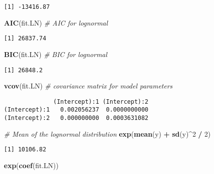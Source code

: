 \documentclass[]{book}
\newenvironment{Shaded}{\begin{snugshade}}{\end{snugshade}}
\newcommand{\KeywordTok}[1]{\textcolor[rgb]{0.13,0.29,0.53}{\textbf{#1}}}
\newcommand{\DecValTok}[1]{\textcolor[rgb]{0.00,0.00,0.81}{#1}}
\newcommand{\StringTok}[1]{\textcolor[rgb]{0.31,0.60,0.02}{#1}}
\newcommand{\CommentTok}[1]{\textcolor[rgb]{0.56,0.35,0.01}{\textit{#1}}}
\newcommand{\OperatorTok}[1]{\textcolor[rgb]{0.81,0.36,0.00}{\textbf{#1}}}
\newcommand{\NormalTok}[1]{#1}
\theoremstyle{definition}
\theoremstyle{definition}
\theoremstyle{definition}
\theoremstyle{remark}
\begin{document}
\begin{verbatim}
[1] -13416.87
\end{verbatim}

\begin{Shaded}
\begin{Highlighting}[]
\KeywordTok{AIC}\NormalTok{(fit.LN)                    }\CommentTok{# AIC for lognormal}
\end{Highlighting}
\end{Shaded}

\begin{verbatim}
[1] 26837.74
\end{verbatim}

\begin{Shaded}
\begin{Highlighting}[]
\KeywordTok{BIC}\NormalTok{(fit.LN)                    }\CommentTok{# BIC for lognormal}
\end{Highlighting}
\end{Shaded}

\begin{verbatim}
[1] 26848.2
\end{verbatim}

\begin{Shaded}
\begin{Highlighting}[]
\KeywordTok{vcov}\NormalTok{(fit.LN)                   }\CommentTok{# covariance matrix for model parameters }
\end{Highlighting}
\end{Shaded}

\begin{verbatim}
              (Intercept):1 (Intercept):2
(Intercept):1   0.002056237  0.0000000000
(Intercept):2   0.000000000  0.0003631082
\end{verbatim}

\begin{Shaded}
\begin{Highlighting}[]
\CommentTok{# Mean of the lognormal distribution}
\KeywordTok{exp}\NormalTok{(}\KeywordTok{mean}\NormalTok{(y) }\OperatorTok{+}\StringTok{ }\KeywordTok{sd}\NormalTok{(y)}\OperatorTok{^}\DecValTok{2} \OperatorTok{/}\StringTok{ }\DecValTok{2}\NormalTok{)}
\end{Highlighting}
\end{Shaded}

\begin{verbatim}
[1] 10106.82
\end{verbatim}

\begin{Shaded}
\begin{Highlighting}[]
\KeywordTok{exp}\NormalTok{(}\KeywordTok{coef}\NormalTok{(fit.LN))}
\end{Highlighting}
\end{Shaded}
\end{document}
